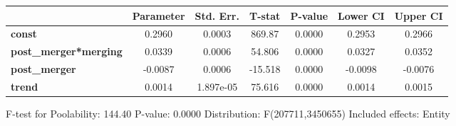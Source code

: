 \documentclass{report}
\begin{document}
\begin{center}
\begin{tabular}{lcccccc}
                              & \textbf{Parameter} & \textbf{Std. Err.} & \textbf{T-stat} & \textbf{P-value} & \textbf{Lower CI} & \textbf{Upper CI}  \\
\midrule
\textbf{const}                &       0.2960       &       0.0003       &      869.87     &      0.0000      &       0.2953      &       0.2966       \\
\textbf{post\_merger*merging} &       0.0339       &       0.0006       &      54.806     &      0.0000      &       0.0327      &       0.0352       \\
\textbf{post\_merger}         &      -0.0087       &       0.0006       &     -15.518     &      0.0000      &      -0.0098      &      -0.0076       \\
\textbf{trend}                &       0.0014       &     1.897e-05      &      75.616     &      0.0000      &       0.0014      &       0.0015       \\
\bottomrule
\end{tabular}
\end{center}

F-test for Poolability: 144.40 \newline
 P-value: 0.0000 \newline
 Distribution: F(207711,3450655) \newline
  \newline
 Included effects: Entity
\end{document}
